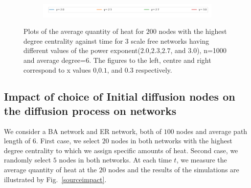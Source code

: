 \documentclass[10pt,a4paper]{article}
\begin{document}
\begin{figure}[H]
\begin{subfigure}[b]{0.32\textwidth}
     	\end{subfigure} \\
     	\begin{subfigure}[b]{0.80\textwidth}
     		\includegraphics[width= \textwidth]{images/legend-gamma.png}
     	\end{subfigure}
     	\caption{Plots of the average quantity of heat for $200$ nodes with the highest degree centrality against time for $3$ scale free networks having different values of the power exponent($2.0$,$2.3$,$2.7$, and $3.0$), n=1000 and average degree=$6$. The figures to the left, centre and right correspond to x values $0$,$0.1$, and $0.3$ respectively.}
     	\label{quantity-exponents}
     \end{figure}
 
     \subsection{Impact of choice of Initial diffusion nodes on the diffusion process on networks}
     We consider a BA network and ER network, both of $100$ nodes and average path length of $6$. First case, we select $20$ nodes in both networks with the highest degree centrality to which we assign specific amounts of heat. Second case, we randomly select $5$ nodes in both networks. At each time $t$, we measure the average quantity of heat at the $20$ nodes and the results of the simulations are illustrated by Fig.~\ref{sourceimpact}.
     
\end{document}
